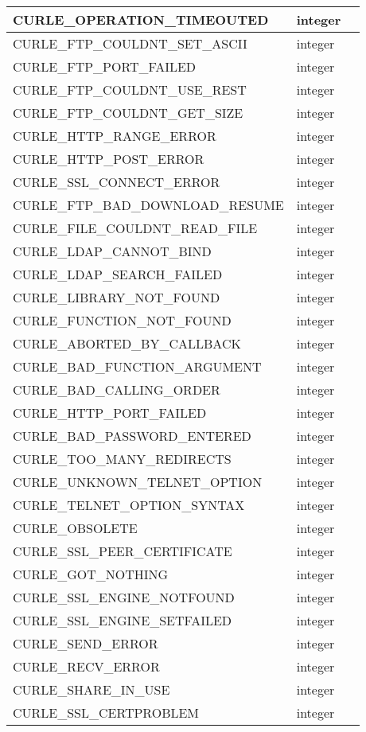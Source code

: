 \begin{longtable}{|m{150pt}|m{40pt}|m{200pt}|}
\hline
CURLE\_OPERATION\_TIMEOUTED&integer&\\
\hline
CURLE\_FTP\_COULDNT\_SET\_ASCII&integer&\\
\hline
CURLE\_FTP\_PORT\_FAILED&integer&\\
\hline
CURLE\_FTP\_COULDNT\_USE\_REST&integer&\\
\hline
CURLE\_FTP\_COULDNT\_GET\_SIZE&integer&\\
\hline
CURLE\_HTTP\_RANGE\_ERROR&integer&\\
\hline
CURLE\_HTTP\_POST\_ERROR&integer&\\
\hline
CURLE\_SSL\_CONNECT\_ERROR&integer&\\
\hline
CURLE\_FTP\_BAD\_DOWNLOAD\_RESUME&integer&\\
\hline
CURLE\_FILE\_COULDNT\_READ\_FILE&integer&\\
\hline
CURLE\_LDAP\_CANNOT\_BIND&integer&\\
\hline
CURLE\_LDAP\_SEARCH\_FAILED&integer&\\
\hline
CURLE\_LIBRARY\_NOT\_FOUND&integer&\\
\hline
CURLE\_FUNCTION\_NOT\_FOUND&integer&\\
\hline
CURLE\_ABORTED\_BY\_CALLBACK&integer&\\
\hline
CURLE\_BAD\_FUNCTION\_ARGUMENT&integer&\\
\hline
CURLE\_BAD\_CALLING\_ORDER&integer&\\
\hline
CURLE\_HTTP\_PORT\_FAILED&integer&\\
\hline
CURLE\_BAD\_PASSWORD\_ENTERED&integer&\\
\hline
CURLE\_TOO\_MANY\_REDIRECTS&integer&\\
\hline
CURLE\_UNKNOWN\_TELNET\_OPTION&integer&\\
\hline
CURLE\_TELNET\_OPTION\_SYNTAX&integer&\\
\hline
CURLE\_OBSOLETE&integer&\\
\hline
CURLE\_SSL\_PEER\_CERTIFICATE&integer&\\
\hline
CURLE\_GOT\_NOTHING&integer&\\
\hline
CURLE\_SSL\_ENGINE\_NOTFOUND&integer&\\
\hline
CURLE\_SSL\_ENGINE\_SETFAILED&integer&\\
\hline
CURLE\_SEND\_ERROR&integer&\\
\hline
CURLE\_RECV\_ERROR&integer&\\
\hline
CURLE\_SHARE\_IN\_USE&integer&\\
\hline
CURLE\_SSL\_CERTPROBLEM&integer&\\

\end{longtable}
